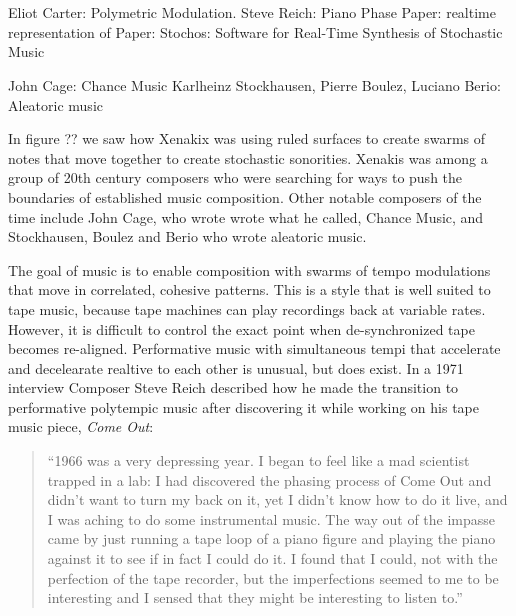 
\chapter{\polytempic}
\label{ch:polytempic}

Eliot Carter: Polymetric Modulation. 
Steve Reich: Piano Phase
Paper: realtime representation of 
Paper: Stochos: Software for Real-Time Synthesis of Stochastic Music

John Cage: Chance Music
Karlheinz Stockhausen, Pierre Boulez, Luciano Berio: Aleatoric music

In figure ?? we saw how Xenakix was using ruled surfaces to create
swarms of notes that move together to create stochastic
sonorities. Xenakis was among a group of 20th century composers who
were searching for ways to push the boundaries of established music
composition. Other notable composers of the time include John Cage,
who wrote wrote what he called, Chance Music, and  Stockhausen, Boulez
and Berio who wrote aleatoric music. 

The goal of \polytempic music is to enable composition with swarms of
tempo modulations that move in correlated, cohesive patterns. This is
a style that is well suited to tape music, because tape machines can
play recordings back at variable rates. However, it is difficult to
control the exact point when de-synchronized tape becomes
re-aligned. Performative music with simultaneous tempi that accelerate
and decelearate realtive to each other is unusual, but does
exist. In a 1971 interview Composer Steve Reich described how he made
the transition to performative polytempic music after discovering it
while working on his tape music piece, \textit{Come Out}:
\begin{quotation}
  ``1966 was a very depressing year. I began to feel like a mad
  scientist trapped in a lab: I had discovered the phasing process
  of Come Out and didn't want to turn my back on it, yet I didn't know
  how to do it live, and I was aching to do some instrumental
  music. The way out of the impasse came by just running a tape loop
  of a piano figure and playing the piano against it to see if in fact
  I could do it. I found that I could, not with the perfection of the
  tape recorder, but the imperfections seemed to me to be interesting
  and I sensed that they might be interesting to listen to.''\cite{Nyman2015}
\end{quotation}



